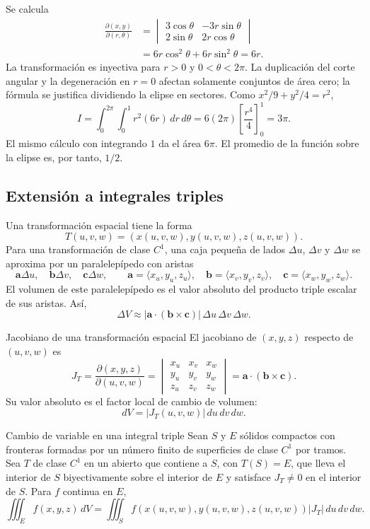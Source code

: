 Se calcula
\begin{align*}
\frac{\partial(x,y)}{\partial(r,\theta)}
&=\begin{vmatrix}3\cos\theta&-3r\sin\theta\\2\sin\theta&2r\cos\theta\end{vmatrix}\\
&=6r\cos^2\theta+6r\sin^2\theta=6r.
\end{align*}
La transformación es inyectiva para $r>0$ y $0<\theta<2\pi$. La duplicación del corte angular y la degeneración en $r=0$ afectan solamente conjuntos de área cero; la fórmula se justifica dividiendo la elipse en sectores. Como $x^2/9+y^2/4=r^2$,
\[
I=\int_0^{2\pi}\int_0^1 r^2(6r)\,dr\,d\theta
=6(2\pi)\left[\frac{r^4}{4}\right]_0^1=3\pi.
\]
El mismo cálculo con integrando $1$ da el área $6\pi$. El promedio de la función sobre la elipse es, por tanto, $1/2$.

\subsection{Extensión a integrales triples}

Una transformación espacial tiene la forma
\[
T(u,v,w)=(x(u,v,w),y(u,v,w),z(u,v,w)).
\]
Para una transformación de clase $C^1$, una caja pequeña de lados $\Delta u$, $\Delta v$ y $\Delta w$ se aproxima por un paralelepípedo con aristas
\[
\mathbf{a}\Delta u,\quad\mathbf{b}\Delta v,\quad\mathbf{c}\Delta w,
\qquad
\mathbf{a}=\langle x_u,y_u,z_u\rangle,\quad
\mathbf{b}=\langle x_v,y_v,z_v\rangle,\quad
\mathbf{c}=\langle x_w,y_w,z_w\rangle.
\]
El volumen de este paralelepípedo es el valor absoluto del producto triple escalar de sus aristas. Así,
\[
\Delta V\approx|\mathbf{a}\cdot(\mathbf{b}\times\mathbf{c})|
\,\Delta u\,\Delta v\,\Delta w.
\]

\begin{mydefinition}{Jacobiano de una transformación espacial}
El jacobiano de $(x,y,z)$ respecto de $(u,v,w)$ es
\[
J_T=\frac{\partial(x,y,z)}{\partial(u,v,w)}
=\begin{vmatrix}
x_u&x_v&x_w\\y_u&y_v&y_w\\z_u&z_v&z_w
\end{vmatrix}
=\mathbf{a}\cdot(\mathbf{b}\times\mathbf{c}).
\]
Su valor absoluto es el factor local de cambio de volumen:
\[
dV=|J_T(u,v,w)|\,du\,dv\,dw.
\]
\end{mydefinition}

\begin{mytheorem}{Cambio de variable en una integral triple}
Sean $S$ y $E$ sólidos compactos con fronteras formadas por un número finito de superficies de clase $C^1$ por tramos. Sea $T$ de clase $C^1$ en un abierto que contiene a $S$, con $T(S)=E$, que lleva el interior de $S$ biyectivamente sobre el interior de $E$ y satisface $J_T\ne0$ en el interior de $S$. Para $f$ continua en $E$,
\[
\iiint_E f(x,y,z)\,dV
=\iiint_S f(x(u,v,w),y(u,v,w),z(u,v,w))
|J_T|\,du\,dv\,dw.
\]
\end{mytheorem}

